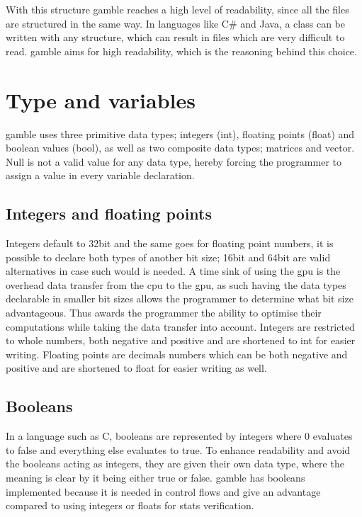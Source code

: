 With this structure \gls{gamble} reaches a high level of readability, since all the files are structured in the same way.
In languages like C\# and Java, a class can be written with any structure, which can result in files which are very difficult to read.
\gls{gamble} aims for high readability, which is the reasoning behind this choice.

\section{Type and variables} \label{sec:Types}
\gls{gamble} uses three primitive data types; integers (int), floating points (float) and boolean values (bool), as well as two composite data types; matrices and vector. 
Null is not a valid value for any data type, hereby forcing the programmer to assign a value in every variable declaration.

\subsection*{Integers and floating points}
Integers default to 32bit and the same goes for floating point numbers, it is possible to declare both types of another bit size; 16bit and 64bit are valid alternatives in case such would is needed.
A time sink of using the \acrshort{gpu} is the overhead data transfer from the \acrshort{cpu} to the \acrshort{gpu}, as such having the data types declarable in smaller bit sizes allows the programmer to determine what bit size advantageous.
Thus awards the programmer the ability to optimise their computations while taking the data transfer into account.
Integers are restricted to whole numbers, both negative and positive and are shortened to int for easier writing.
Floating points are decimals numbers which can be both negative and positive and are shortened to float for easier writing as well.

\subsection*{Booleans}
In a language such as C, booleans are represented by integers where 0 evaluates to false and everything else evaluates to true.
To enhance readability and avoid the booleans acting as integers, they are given their own data type, where the meaning is clear by it being either true or false.
\gls{gamble} has booleans implemented because it is needed in control flows and give an advantage compared to using integers or floats for stats verification.   

